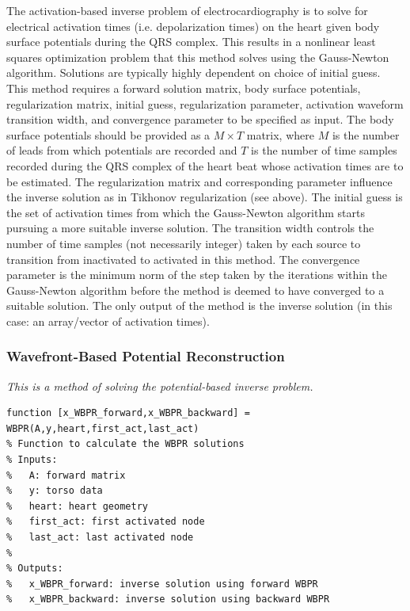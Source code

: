 The activation-based inverse problem of electrocardiography is to solve for electrical activation times (i.e. depolarization times) on the heart given body surface potentials during the QRS complex. This results in a nonlinear least squares optimization problem that this method solves using the Gauss-Newton algorithm. Solutions are typically highly dependent on choice of initial guess. This method requires a forward solution matrix, body surface potentials, regularization matrix, initial guess, regularization parameter, activation waveform transition width, and convergence parameter to be specified as input. The body surface potentials should be provided as a $M \times T$ matrix, where $M$ is the number of leads from which potentials are recorded and $T$ is the number of time samples recorded during the QRS complex of the heart beat whose activation times are to be estimated. The regularization matrix and corresponding parameter influence the inverse solution as in Tikhonov regularization (see above). The initial guess is the set of activation times from which the Gauss-Newton algorithm starts pursuing a more suitable inverse solution. The transition width controls the number of time samples (not necessarily integer) taken by each source to transition from inactivated to activated in this method. The convergence parameter is the minimum norm of the step taken by the iterations within the Gauss-Newton algorithm before the method is deemed to have converged to a suitable solution. The only output of the method is the inverse solution (in this case: an array/vector of activation times).

\subsubsection{Wavefront-Based Potential Reconstruction}

\vspace{5pt}\textit{This is a method of solving the potential-based inverse problem.}\vspace{5pt}

\begin{verbatim}
function [x_WBPR_forward,x_WBPR_backward] = WBPR(A,y,heart,first_act,last_act)
% Function to calculate the WBPR solutions
% Inputs:
%   A: forward matrix
%   y: torso data
%   heart: heart geometry
%   first_act: first activated node
%   last_act: last activated node
%
% Outputs:
%   x_WBPR_forward: inverse solution using forward WBPR
%   x_WBPR_backward: inverse solution using backward WBPR
\end{verbatim}

